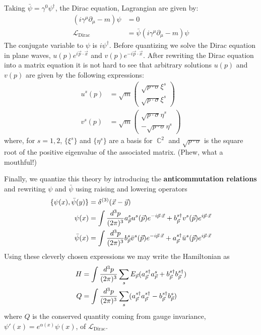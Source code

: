 \documentclass{report}
\theoremstyle{plain}
\theoremstyle{definition}
\theoremstyle{remark}
\newcommand{\FR}[2]{\frac{#1}{#2}}
\newcommand{\mc}{\mathcal}
\newcommand{\gam}{\gamma}
\newcommand{\sg}{\sigma}
\newcommand{\di}{\partial}
\newcommand{\ha} { a}
\newcommand{\hb} { b}
\DeclareMathOperator{\bC}{\mathbb{C}}
\begin{document}
Taking $\bar\psi = \gam^0\psi^\dag$, the Dirac equation, Lagrangian are
given by:
\begin{align*}
    (i\gam^\mu\di_\mu - m)\psi &= 0\\
    \mc L_{\text{Dirac}} &= \bar\psi(i\gam^\mu\di_\mu-m)\psi
\end{align*}
The conjugate variable to $\psi$ is $i\psi^\dag$. Before quantizing we
solve the Dirac equation in plane waves, $u(p)e^{i\vec p\cdot \vec x}$
and $v(p)e^{-i\vec p\cdot \vec x}$. After rewriting the Dirac equation
into a matrix equation it is not hard to see that arbitrary solutions
$u(p)$ and $v(p)$ are given by the following expressions:
\begin{align*}
    u^s(p) &= \sqrt{m}\begin{pmatrix} \sqrt{p\cdot \sg} \xi^s\\
                      \sqrt{p\cdot \sg} \xi^s\end{pmatrix}\\
    v^s(p) &= \sqrt{m}\begin{pmatrix} \sqrt{p\cdot \sg} \eta^s\\
                      -\sqrt{p\cdot \sg} \eta^s\end{pmatrix}
\end{align*}
where, for $s=1,2$, $\{\xi^s\}$ and $\{\eta^s\}$ are a basis for $\bC^2$
and $\sqrt{p\cdot \sg}$ is the square root of the positive eigenvalue of
the associated matrix. (Phew, what a mouthful!)


Finally, we quantize this theory by introducing the \textbf{anticommutation
relations} and rewriting $\psi$ and $\bar\psi$ using raising and lowering
operators
\begin{align} 
\{\psi(x),\bar\psi(y)\} &= \delta^{(3)}(\vec x-\vec y)\\
\psi(x) &= \int \FR{d^3p}{(2\pi)^3} 
\ha^{s}_\vp u^s(\vp) e^{-i\vp\cdot\vx} +
\hb^{s\dag}_\vp v^s(\vp) e^{i\vp\cdot\vx}\label{ferm1} \\
\bar\psi(x) &= \int \FR{d^3p}{(2\pi)^3} 
\hb^{s}_\vp \bar v^s(\vp) e^{-i\vp\cdot\vx} +
\ha^{s\dag}_\vp \bar u^s(\vp) e^{i\vp\cdot\vx}\label{ferm2}
\end{align}
Using these cleverly chosen expressions we may write the Hamiltonian as
\begin{align*}
    H &= \int \FR{d^3p}{(2\pi)^3}  \sum_s
    E_\vp(\ha^{s\dag}_\vp\ha^{s}_\vp+ \hb^{s\dag}_\vp\hb^{s\dag}_\vp)\\
    Q &= \int \FR{d^3p}{(2\pi)^3}  \sum_s
    (\ha^{s\dag}_\vp\ha^{s\dag}_\vp - \hb^{s\dag}_\vp\hb^{s}_\vp)
\end{align*}
where $Q$ is the conserved quantity coming from gauge invariance,
$\psi'(x)=e^{\alpha(x)}\psi(x)$, of $\mc L_{\text{Dirac}}$.
\end{document}
